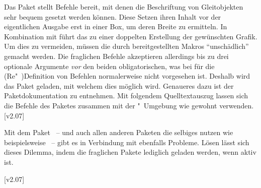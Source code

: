 
Das Paket  stellt Befehle bereit, mit denen die Beschriftung 
von Gleitobjekten sehr bequem gesetzt werden können. Diese Setzen ihren Inhalt 
vor der eigentlichen Ausgabe erst in einer Box, um deren Breite zu ermitteln. 
In Kombination mit  führt das zu einer doppelten 
Erstellung der gewünschten Grafik. Um dies zu vermeiden, müssen die durch 
 bereitgestellten Makros \enquote{unschädlich} gemacht 
werden. Die fraglichen Befehle akzeptieren allerdings bis zu drei optionale 
Argumente \emph{vor} den beiden obligatorischen, was bei  für 
die (Re"~)Definition von Befehlen normalerweise nicht vorgesehen ist. Deshalb 
wird das Paket  geladen, mit welchem dies möglich wird. 
Genaueres dazu ist der Paketdokumentation zu entnehmen. Mit folgendem 
Quelltextauszug lassen sich die Befehle des Paketes  zusammen 
mit der "~Umgebung wie gewohnt verwenden.
[v2.07]
%
\begin{quoting}
\begin{Code}
\usepackage{floatrow}
\usepackage{xparse}
\ifpdf\else
\fi
\end{Code}
\end{quoting}



Mit dem Paket ~-- und auch allen anderen Paketen die 
selbiges nutzen wie beispielsweise ~-- gibt es in Verbindung 
mit  ebenfalls Probleme. Lösen lässt sich dieses Dilemma, 
indem die fraglichen Pakete lediglich geladen werden, wenn  
aktiv ist.
%
\begin{quoting}[rightmargin=0pt]
\begin{Code}
\ifpdf
  \usepackage{tikz}%
\fi
\end{Code}
\end{quoting}



%
[v2.07]
